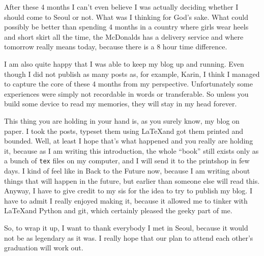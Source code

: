 After these 4 months I can't even believe I was actually deciding whether I should come to Seoul or not. What was I thinking for God's sake. What could possibly be better than spending 4 months in a country where girls wear heels and short skirt all the time, the McDonalds has a delivery service and where tomorrow really means today, because there is a 8 hour time difference.

I am also quite happy that I was able to keep my blog up and running. Even though I did not publish as many posts as, for example, Karin, I think I managed to capture the core of these 4 months from my perspective. Unfortunately some experiences were simply not recordable in words or transferable. So unless you build some device to read my memories, they will stay in my head forever.

This thing you are holding in your hand is, as you surely know, my blog on paper. I took the posts, typeset them using \LaTeX and got them printed and bounded. Well, at least I hope that's what happened and you really are holding it, because as I am writing this introduction, the whole ``book'' still exists only as a bunch of \texttt{tex} files on my computer, and I will send it to the printshop in few days. I kind of feel like in Back to the Future now, because I am writing about things that will happen in the future, but earlier than someone else will read this. Anyway, I have to give credit to my sis for the idea to try to publish my blog. I have to admit I really enjoyed making it, because it allowed me to tinker with \LaTeX and Python and git, which certainly pleased the geeky part of me.

So, to wrap it up, I want to thank everybody I met in Seoul, because it would not be as legendary as it was. I really hope that our plan to attend each other's graduation will work out.